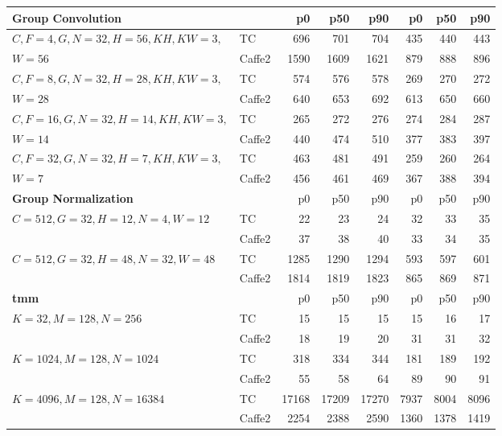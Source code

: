 \begin{tabular}{llrrrrrr}
\toprule
\textbf{Group Convolution} &  & p0 & p50 & p90 & p0 & p50 & p90\\
\midrule
$C, F = 4, G, N = 32, H = 56, \textit{KH}, \textit{KW} = 3,$ & TC      & 696 & 701 & 704 & 435 & 440 & 443\\
$W = 56$                                                     & Caffe2  & 1590 & 1609 & 1621 & 879 & 888 & 896\\
\midrule
$C, F = 8, G, N = 32, H = 28, \textit{KH}, \textit{KW} = 3,$ & TC      & 574 & 576 & 578 & 269 & 270 & 272\\
$W = 28$                                                     & Caffe2  & 640 & 653 & 692 & 613 & 650 & 660\\
\midrule
$C, F = 16, G, N = 32, H = 14, \textit{KH}, \textit{KW} = 3,$ & TC     & 265 & 272 & 276 & 274 & 284 & 287\\
$W = 14$                                                      & Caffe2 & 440 & 474 & 510 & 377 & 383 & 397\\
\midrule
$C, F = 32, G, N = 32, H = 7, \textit{KH}, \textit{KW} = 3,$ & TC       & 463 & 481 & 491 & 259 & 260 & 264\\
$W = 7$                                                      & Caffe2   & 456 & 461 & 469 & 367 & 388 & 394\\

\toprule
\textbf{Group Normalization} &  & p0 & p50 & p90 & p0 & p50 & p90\\
\midrule
\multirow{2}{*}{$C = 512, G = 32, H = 12, N = 4, W = 12$}
  & TC      & 22 & 23 & 24 & 32 & 33 & 35\\
  & Caffe2  & 37 & 38 & 40 & 33 & 34 & 35\\
\midrule
\multirow{2}{*}{$C = 512, G = 32, H = 48, N = 32, W = 48$}
  & TC     & 1285 & 1290 & 1294 & 593 & 597 & 601\\
  & Caffe2 & 1814 & 1819 & 1823 & 865 & 869 & 871\\

\toprule
\textbf{tmm} &  & p0 & p50 & p90 & p0 & p50 & p90\\
\midrule
\multirow{2}{*}{$K = 32, M = 128, N = 256$}
  & TC     & 15 & 15 & 15 & 15 & 16 & 17\\
  & Caffe2 & 18 & 19 & 20 & 31 & 31 & 32\\
\midrule
\multirow{2}{*}{$K = 1024, M = 128, N = 1024$}
  & TC     & 318 & 334 & 344 & 181 & 189 & 192\\
  & Caffe2 & 55 & 58 & 64 & 89 & 90 & 91\\
\midrule
\multirow{2}{*}{$K = 4096, M = 128, N = 16384$}
  & TC     & 17168 & 17209 & 17270 & 7937 & 8004 & 8096\\
  & Caffe2 & 2254 & 2388 & 2590 & 1360 & 1378 & 1419\\
\bottomrule
\end{tabular}

